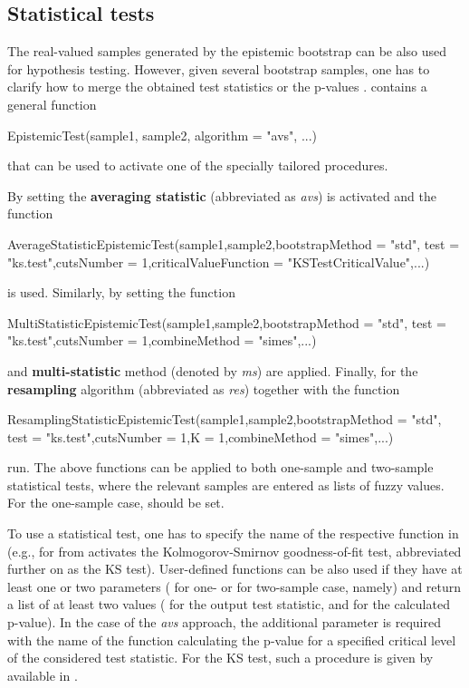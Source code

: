\subsection{Statistical tests}


The real-valued samples generated by the epistemic bootstrap can be also used for hypothesis testing. 
However, given several bootstrap samples, one has to clarify how to merge the obtained test statistics or the p-values \citep{10.1007/978-3-031-08974-9_39}.
 contains a general function 
\begin{example}
EpistemicTest(sample1, sample2, algorithm = "avs", ...)
\end{example}
that can be used to activate one of the specially tailored procedures.

By setting  the \textbf{averaging statistic} (abbreviated as \emph{avs}) is activated and the function
\begin{example}
AverageStatisticEpistemicTest(sample1,sample2,bootstrapMethod = "std",
  test = "ks.test",cutsNumber = 1,criticalValueFunction = "KSTestCriticalValue",...)
\end{example}
is used.
Similarly, by setting  the function
\begin{example}
MultiStatisticEpistemicTest(sample1,sample2,bootstrapMethod = "std",
  test = "ks.test",cutsNumber = 1,combineMethod = "simes",...)
\end{example}
and \textbf{multi-statistic} method (denoted by \emph{ms}) are applied.
Finally, for  the \textbf{resampling} algorithm (abbreviated as \emph{res}) together with the function
\begin{example}
ResamplingStatisticEpistemicTest(sample1,sample2,bootstrapMethod = "std",
  test = "ks.test",cutsNumber = 1,K = 1,combineMethod = "simes",...)
\end{example}
run.
The above functions can be applied to both one-sample and two-sample statistical tests, where the relevant samples are entered as lists of fuzzy values. 
For the one-sample case,  should be set.

To use a statistical test, one has to specify the name of the respective function in  (e.g.,  for  from  activates the Kolmogorov-Smirnov goodness-of-fit test, abbreviated further on as the KS test).
User-defined functions can be also used if they have at least one or two parameters ( for one- or  for two-sample case, namely) and return a list of at least two values ( for the output test statistic, and  for the calculated p-value).
In the case of the \emph{avs} approach, the additional parameter  is required with the name of the function  calculating the p-value for a specified critical level of the considered test statistic.
For the KS test, such a procedure is given by  available in .

